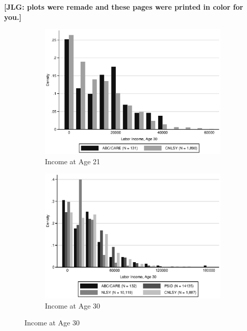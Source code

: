 \noindent \textbf{[JLG: plots were remade and these pages were printed in color for you.]}


\begin{figure}[H]
	\caption{Support of ABC/CARE and Auxiliary Data} \label{fig:support}
	\begin{subfigure}[h]{0.9\textwidth}
	\centering
	\caption{Income at Age 21} \label{fig:support_inc21}
	\includegraphics[width=\textwidth]{AppOutput/Methodology/support_inc21.eps}
	\end{subfigure}
	
	\begin{subfigure}[h]{0.9\textwidth}
	\centering
	\caption{Income at Age 30} \label{fig:support_inc30}
	\includegraphics[width=\textwidth]{AppOutput/Methodology/support_inc30.eps}
	\end{subfigure}
\end{figure}





